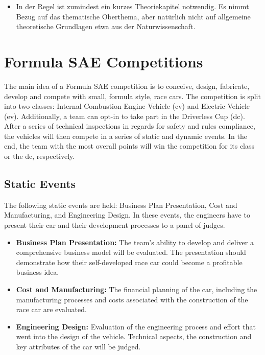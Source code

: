 \begin{itemize}
    \item In der Regel ist zumindest ein kurzes Theoriekapitel notwendig. Es nimmt Bezug auf das thematische Oberthema, aber natürlich nicht auf allgemeine theoretische Grundlagen etwa aus der Naturwissenschaft.
\end{itemize}

\section{Formula SAE Competitions}
The main idea of a Formula SAE competition is to conceive, design, fabricate, develop and compete with small, formula style, race cars.
The competition is split into two classes: Internal Combustion Engine Vehicle (\acrshort{cv}) and Electric Vehicle (\acrshort{ev}).
Additionally, a team can opt-in to take part in the Driverless Cup (\acrshort{dc}).
After a series of technical inspections in regards for safety and rules compliance, the vehicles will then compete in a series of static and dynamic events. In the end, the team with the most overall points will win the competition for its class or the \acrlong{dc}, respectively.

\subsection{Static Events}
The following static events are held: Business Plan Presentation, Cost and Manufacturing, and Engineering Design. In these events, the engineers have to present their car and their development processes to a panel of judges.

\begin{itemize}
    \item \textbf{Business Plan Presentation:} The team's ability to develop and deliver a comprehensive business model will be evaluated. The presentation should demonstrate how their self-developed race car could become a profitable business idea.
    \item \textbf{Cost and Manufacturing:} The financial planning of the car, including the manufacturing processes and costs associated with the construction of the race car are evaluated.
    \item \textbf{Engineering Design:} Evaluation of the engineering process and effort that went into the design of the vehicle. Technical aspects, the construction and key attributes of the car will be judged.
\end{itemize}


